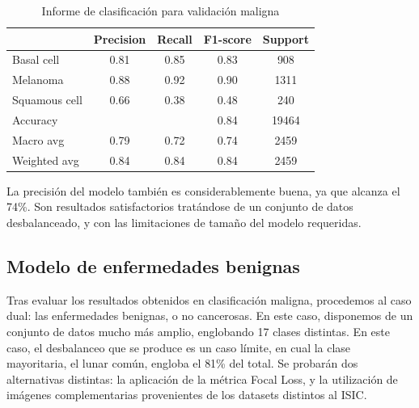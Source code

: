 \begin{table}[!ht]
	\centering
	\begin{tabular}{|l|c|c|c|c|}
		\hline
		& Precision & Recall & F1-score & Support \\
		\hline
		Basal cell & 0.81 & 0.85 & 0.83 & 908 \\
		Melanoma & 0.88 & 0.92 & 0.90 & 1311 \\
		Squamous cell & 0.66 & 0.38 & 0.48 & 240 \\
		\hline
		Accuracy &  &  & 0.84 & 19464 \\
		Macro avg & 0.79& 0.72& 0.74&2459\\
		Weighted avg&0.84&0.84&0.84&2459\\
		\hline
	\end{tabular}
	\caption{Informe de clasificación para validación maligna}
	\label{tab:malignometrics}
\end{table}

La precisión del modelo también es considerablemente buena, ya que alcanza el 74\%. Son resultados satisfactorios tratándose de un conjunto de datos desbalanceado, y con las limitaciones de tamaño del modelo requeridas.


\subsection{Modelo de enfermedades benignas}

Tras evaluar los resultados obtenidos en clasificación maligna, procedemos al caso dual: las enfermedades benignas, o no cancerosas. En este caso, disponemos de un conjunto de datos mucho más amplio, englobando 17 clases distintas. En este caso, el desbalanceo que se produce es un caso límite, en cual la clase mayoritaria, el lunar común, engloba el 81\% del total. Se probarán dos alternativas distintas: la aplicación de la métrica Focal Loss, y la utilización de imágenes complementarias provenientes de los datasets distintos al ISIC.

